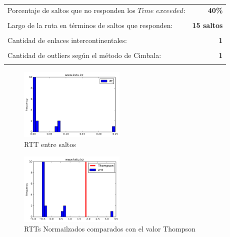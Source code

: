 \begin{center}
\begin{tabular}{p{6.5cm}r}
Porcentaje de saltos que no responden los $Time$ $exceeded$: & \textbf{40\%} \\ \\ 
Largo de la ruta en términos de saltos que responden: &\textbf{15 saltos} \\ \\
Cantidad de enlaces intercontinentales: & \textbf{1} \\ \\
Cantidad de outliers según el método de Cimbala: & \textbf{1} \\ \\
\end{tabular}
\end{center}


\begin{figure}[H]
  \centering
    \includegraphics[width=0.45\textwidth]{histogramas_rtt/www-kstu-kz.png}
  \caption{RTT entre saltos}
  \label{entropia-s}
\end{figure}

\begin{center}
\end{center}


\begin{figure}[H]
  \centering
    \includegraphics[width=0.45\textwidth]{histogramas_thompson/www-kstu-kz.png}
  \caption{RTTs Normailzados comparados con el valor Thompson}
  \label{entropia-s}
\end{figure}

